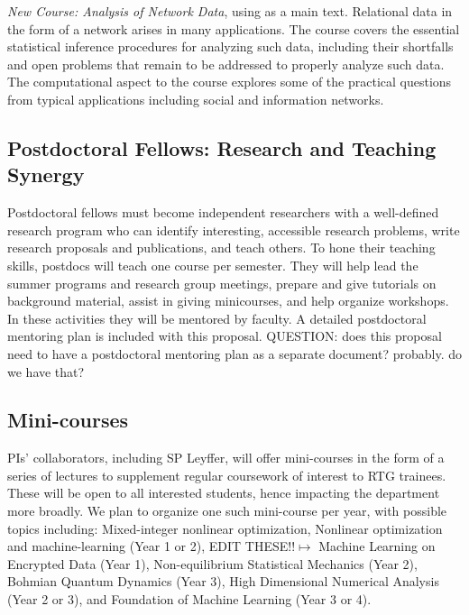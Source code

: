 \documentclass[11pt]{NSFamsart}
\begin{document}
\emph{New Course: Analysis of Network Data}, using \cite{KolaczykBook2017} as a main text. Relational data in the form of a network arises in many applications. The course covers the essential statistical inference procedures for analyzing such data, including their shortfalls and open problems that remain to be addressed to properly analyze such data. The computational aspect to the course explores some of the practical questions from  typical applications including  social and information networks. 


\subsection*{Postdoctoral Fellows: Research and Teaching Synergy}
Postdoctoral fellows must become independent researchers with a well-defined research program who can identify interesting, accessible research problems, write research proposals and publications, and teach others.  To hone their teaching skills, postdocs will teach one course per semester. They will help lead the summer programs and research group meetings, prepare and give tutorials on background material, assist in giving minicourses, and help organize workshops.  In these activities they will be mentored by faculty. A detailed postdoctoral mentoring plan is included with this proposal. {\color{red}QUESTION: does this proposal need to have a postdoctoral mentoring plan as a separate document? probably. do we have that?}

\subsection*{Mini-courses} 
PIs' collaborators, including SP Leyffer, will offer mini-courses in the form of a series of lectures to supplement regular coursework of interest to RTG trainees. These will be open to all interested students, hence impacting the department more broadly. 
We plan to organize one such mini-course per year, with possible topics including: 
Mixed-integer nonlinear optimization, Nonlinear optimization and machine-learning (Year 1 or 2), 
{\color{red}EDIT THESE!!$\mapsto$} Machine Learning on Encrypted Data (Year 1),  Non-equilibrium Statistical Mechanics (Year 2),   Bohmian Quantum Dynamics (Year 3), High Dimensional Numerical Analysis (Year 2 or 3), and Foundation of Machine Learning (Year 3 or 4). 
\end{document}
